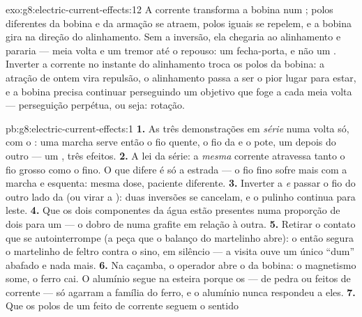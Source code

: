 \begin{solution}{exo:g8:electric-current-effects:12}
A corrente transforma a bobina num ; polos diferentes da bobina e
da armação se atraem, polos iguais se repelem, e a bobina gira na
direção do alinhamento. Sem a inversão, ela chegaria ao alinhamento e
pararia --- meia volta e um tremor até o repouso: um fecha-porta, e
não um . Inverter a corrente no instante do alinhamento troca os
polos da bobina: a atração de ontem vira repulsão, o alinhamento
passa a ser o pior lugar para estar, e a bobina precisa continuar
perseguindo um objetivo que foge a cada meia volta --- perseguição
perpétua, ou seja: rotação.
\end{solution}

\begin{solution}{pb:g8:electric-current-effects:1}
\textbf{1.} As três demonstrações em \emph{série} numa volta só, com
o : uma marcha serve então o fio quente, o fio da 
e o pote, um depois do outro --- um , três efeitos.
\textbf{2.} A lei da série: a \emph{mesma} corrente atravessa tanto o
fio grosso como o fino. O que difere é só a estrada --- o fio fino
sofre mais com a marcha e esquenta: mesma dose, paciente diferente.
\textbf{3.} Inverter a  \emph{e} passar o fio do outro lado da
 (ou virar a ): duas inversões se cancelam, e o pulinho
continua para leste.
\textbf{4.} Que os dois componentes da água estão presentes numa
proporção de dois para um --- o dobro de  numa grafite em relação
à outra.
\textbf{5.} Retirar o contato que se autointerrompe (a peça que o
balanço do martelinho abre): o  então segura o martelinho de
feltro contra o sino, em silêncio --- a visita ouve um único ``dum''
abafado e nada mais.
\textbf{6.} Na caçamba, o operador abre o  da bobina: o
magnetismo some, o ferro cai. O alumínio segue na esteira porque os
 --- de pedra ou feitos de corrente --- só agarram a família do
ferro, e o alumínio nunca respondeu a eles.
\textbf{7.} Que os polos de um  feito de corrente seguem o sentido

\end{solution}
